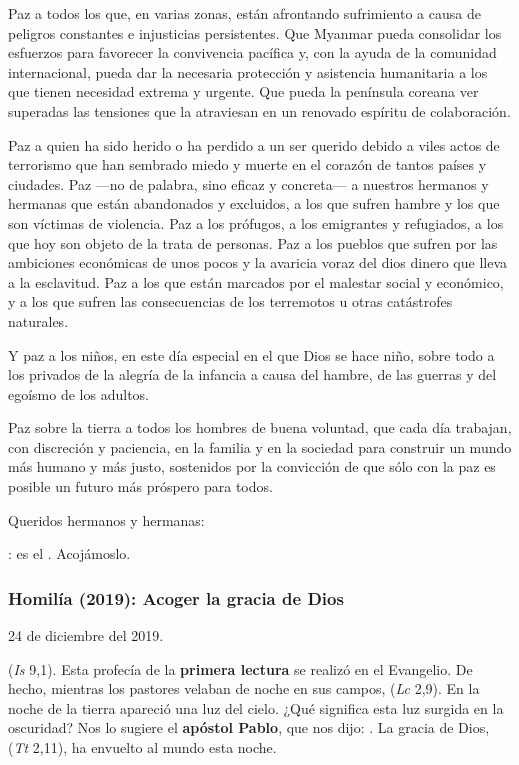 Paz a todos los que, en varias zonas, están afrontando sufrimiento a causa de peligros constantes e injusticias persistentes. Que Myanmar pueda consolidar los esfuerzos para favorecer la convivencia pacífica y, con la ayuda de la comunidad internacional, pueda dar la necesaria protección y asistencia humanitaria a los que tienen necesidad extrema y urgente. Que pueda la península coreana ver superadas las tensiones que la atraviesan en un renovado espíritu de colaboración.

Paz a quien ha sido herido o ha perdido a un ser querido debido a viles actos de terrorismo que han sembrado miedo y muerte en el corazón de tantos países y ciudades. Paz ---no de palabra, sino eficaz y concreta--- a nuestros hermanos y hermanas que están abandonados y excluidos, a los que sufren hambre y los que son víctimas de violencia. Paz a los prófugos, a los emigrantes y refugiados, a los que hoy son objeto de la trata de personas. Paz a los pueblos que sufren por las ambiciones económicas de unos pocos y la avaricia voraz del dios dinero que lleva a la esclavitud. Paz a los que están marcados por el malestar social y económico, y a los que sufren las consecuencias de los terremotos u otras catástrofes naturales.

Y paz a los niños, en este día especial en el que Dios se hace niño, sobre todo a los privados de la alegría de la infancia a causa del hambre, de las guerras y del egoísmo de los adultos.

Paz sobre la tierra a todos los hombres de buena voluntad, que cada día trabajan, con discreción y paciencia, en la familia y en la sociedad para construir un mundo más humano y más justo, sostenidos por la convicción de que sólo con la paz es posible un futuro más próspero para todos.

Queridos hermanos y hermanas:

: es el . Acojámoslo.

\subsubsection{Homilía (2019): Acoger la gracia de Dios}

24 de diciembre del 2019.

 (\emph{Is} 9,1). Esta profecía de la \textbf{primera lectura} se realizó en el Evangelio. De hecho, mientras los pastores velaban de noche en sus campos,  (\emph{Lc} 2,9). En la noche de la tierra apareció una luz del cielo. ¿Qué significa esta luz surgida en la oscuridad? Nos lo sugiere el \textbf{apóstol Pablo}, que nos dijo: . La gracia de Dios,  (\emph{Tt} 2,11), ha envuelto al mundo esta noche.

